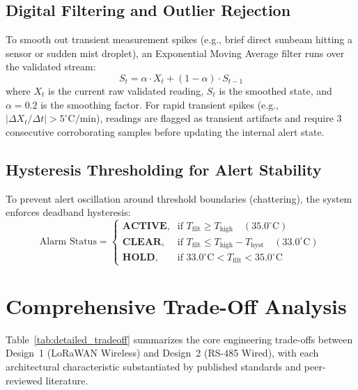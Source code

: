 \documentclass[12pt]{article}
\begin{document}
\subsection{Digital Filtering and Outlier Rejection}
To smooth out transient measurement spikes (e.g., brief direct sunbeam hitting a sensor or sudden mist droplet), an Exponential Moving Average filter runs over the validated stream:
\begin{equation}
S_t = \alpha \cdot X_t + (1 - \alpha) \cdot S_{t-1}
\end{equation}
where $X_t$ is the current raw validated reading, $S_t$ is the smoothed state, and $\alpha = 0.2$ is the smoothing factor. For rapid transient spikes (e.g., $|\Delta X_t / \Delta t| > 5^\circ\text{C/min}$), readings are flagged as transient artifacts and require 3 consecutive corroborating samples before updating the internal alert state.

\subsection{Hysteresis Thresholding for Alert Stability}
To prevent alert oscillation around threshold boundaries (chattering), the system enforces deadband hysteresis:
\begin{equation}
\text{Alarm Status} = \begin{cases}
    \textbf{ACTIVE}, & \text{if } T_{\text{filt}} \ge T_{\text{high}} \quad (35.0^\circ\text{C}) \\
    \textbf{CLEAR},  & \text{if } T_{\text{filt}} \le T_{\text{high}} - T_{\text{hyst}} \quad (33.0^\circ\text{C}) \\
    \textbf{HOLD},   & \text{if } 33.0^\circ\text{C} < T_{\text{filt}} < 35.0^\circ\text{C}
\end{cases}
\end{equation}

\section{Comprehensive Trade-Off Analysis}

Table~\ref{tab:detailed_tradeoff} summarizes the core engineering trade-offs between Design~1 (LoRaWAN Wireless) and Design~2 (RS-485 Wired), with each architectural characteristic substantiated by published standards and peer-reviewed literature.
\end{document}
